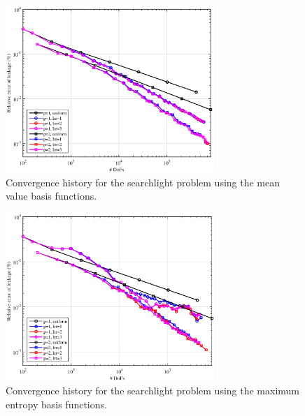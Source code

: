 \begin{figure}
\centering
\includegraphics[width=0.70\textwidth]{figures/sec_BF/SL_MV_Err.eps}
\caption{Convergence history for the searchlight problem using the mean value basis functions.}
\label{fig::BF_Results_SL_MV_err}
\end{figure}

\begin{figure}
\centering
\includegraphics[width=0.70\textwidth]{figures/sec_BF/SL_MAXENT_Err.eps}
\caption{Convergence history for the searchlight problem using the maximum entropy basis functions.}
\label{fig::BF_Results_SL_MAXENT_err}
\end{figure}

